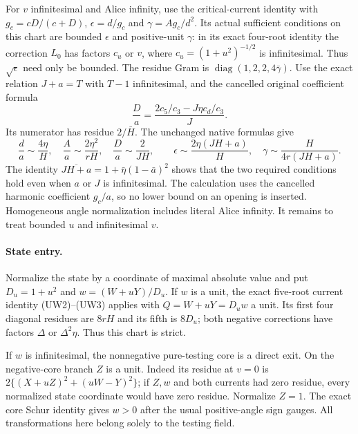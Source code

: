 For $v$ infinitesimal and Alice infinity, use the critical-current
identity with $g_c=cD/(c+D)$, $\epsilon=d/g_c$ and
$\gamma=Ag_c/d^2$. Its actual sufficient conditions on this chart
are bounded $\epsilon$ and positive-unit $\gamma$: in its exact
four-root identity the correction $L_0$ has factors $c_u$ or $v$,
where $c_u=(1+u^2)^{-1/2}$ is infinitesimal. Thus $\sqrt\epsilon$
need only be bounded. The residue Gram is
$\operatorname{diag}(1,2,2,4\bar\gamma)$.
Use the exact relation $J+a=T$ with $T-1$ infinitesimal, and the
cancelled original coefficient formula
\[
 \frac Da=\frac{2c_5/c_3-J\eta c_d/c_3}{J}.
\]
Its numerator has residue $2/\bar H$. The unchanged native formulas give
\[
 \frac d a\sim\frac{4\eta}{H},\quad
 \frac A a\sim\frac{2\eta^2}{rH},\quad
 \frac D a\sim\frac2{JH},\qquad
 \epsilon\sim\frac{2\eta(JH+a)}H,\quad
 \gamma\sim\frac{H}{4r(JH+a)}.
\]
The identity
$\overline{JH+a}=1+\bar\eta(1-\bar a)^2$ shows that the two required
conditions hold even when $a$ or $J$ is infinitesimal. The calculation
uses the cancelled harmonic coefficient $g_c/a$, so no lower bound
on an opening is inserted. Homogeneous angle normalization includes
literal Alice infinity. It remains to treat bounded $u$ and
infinitesimal $v$.

\paragraph{State entry.}
Normalize the state by a coordinate of maximal absolute value and put
$D_u=1+u^2$ and $w=(W+uY)/D_u$. If $w$ is a unit, the exact five-root
current identity (UW2)--(UW3) applies with $Q=W+uY=D_uw$ a unit.
Its first four diagonal residues are $8rH$ and its fifth is
$8D_u$; both negative corrections have factors $\Delta$ or
$\Delta^2\eta$. Thus this chart is strict.

If $w$ is infinitesimal, the nonnegative pure-testing core is a direct
exit. On the negative-core branch $Z$ is a unit. Indeed its residue
at $v=0$ is $2\{(X+uZ)^2+(uW-Y)^2\}$; if $Z,w$ and both currents
had zero residue, every normalized state coordinate would have zero
residue. Normalize $Z=1$. The exact core Schur identity gives $w>0$
after the usual positive-angle sign gauges. All transformations here
belong solely to the testing field.

